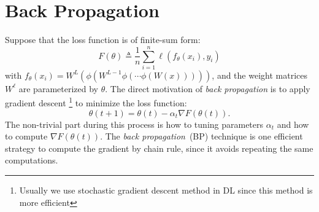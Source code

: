 \section{Back Propagation}
Suppose that the loss function is of finite-sum form:
\[
F(\theta)\triangleq\frac{1}{n}\sum_{i=1}^n\ell(f_\theta(x_i),y_i) 
\]
with 
$f_\theta(x_i) = W^L(\phi(W^{L-1}\phi(\cdots\phi(W(x)))))$, 
and the weight matrices $W^{\ell}$ are parameterized by $\theta$.
The direct motivation of \emph{back propagation} is to apply gradient descent
\footnote{Usually we use stochastic gradient descent method in DL since this method is more efficient} 
to minimize the loss function:
\[
\theta(t+1) = \theta(t) - \alpha_t\nabla F(\theta(t)).
\]
The non-trivial part during this process is how to tuning parameters $\alpha_t$ and how to compute 
$\nabla F(\theta(t))$.
The \emph{back propagation}~(BP) technique is one efficient strategy to compute the gradient by chain rule, since it avoids repeating the same computations.

